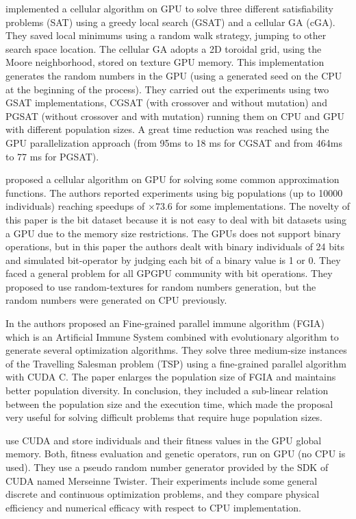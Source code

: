 \documentclass[Afour,sageh,times]{sagej}
\begin{document}
\cite{zhongwen-luo-cellular-2006} implemented a cellular algorithm on GPU to solve three different satisfiability problems (SAT) 
using a greedy local search (GSAT) \citep{Selman93domain-independentextensions} and a cellular GA (cGA). 
They saved local minimums using a random walk strategy, jumping to other search space location. 
The cellular GA adopts a 2D toroidal grid, using the Moore neighborhood, stored on texture GPU memory. This implementation generates the random numbers in the GPU (using a generated seed on the CPU at the beginning of the process). They carried out the experiments using two GSAT implementations, CGSAT (with crossover and without mutation) and PGSAT (without crossover and with mutation) running them on CPU and GPU with different population sizes. A great time reduction was reached using the GPU parallelization approach (from 95ms to 18 ms for CGSAT and from 464ms to 77 ms for PGSAT).

\cite{jian_ming_li_efficient_2007} proposed a cellular algorithm on GPU for solving some common approximation functions. The authors reported experiments using big populations (up to 10000 individuals) reaching speedups of $\times73.6$ for some implementations. The novelty of this paper is the bit dataset because it is not easy to deal with bit datasets using a GPU due to the memory size restrictions. The GPUs does not support binary operations, but in this paper the authors dealt with binary individuals of 24 bits  and simulated bit-operator by judging each bit of a binary value is 1 or 0. They faced a general problem for all GPGPU community with bit operations. They proposed to use random-textures for random numbers generation, but the random numbers were generated on CPU previously. 

In \citep{Li:2009:PIA:1726585.1726930} the authors proposed an Fine-grained parallel immune algorithm (FGIA) which is an Artificial Immune System combined with evolutionary algorithm to generate several optimization algorithms. They solve three medium-size instances of the Travelling Salesman problem (TSP) using a fine-grained parallel algorithm with CUDA C. The paper enlarges the population size of FGIA and maintains better population diversity. In conclusion, they included a sub-linear relation between the population size and the execution time, which made the proposal very useful for solving difficult problems that require huge population sizes.

\cite{springerlink:10.1007978-3-642-12538-619} use CUDA and store individuals and their fitness values in the GPU global memory. Both, fitness evaluation and genetic operators, run on GPU (no CPU is used). 
They use a pseudo random number generator provided by the SDK of CUDA named Merseinne Twister. Their experiments include some general discrete and continuous optimization problems, and they compare physical efficiency and numerical efficacy with respect to CPU implementation. 
\end{document}
